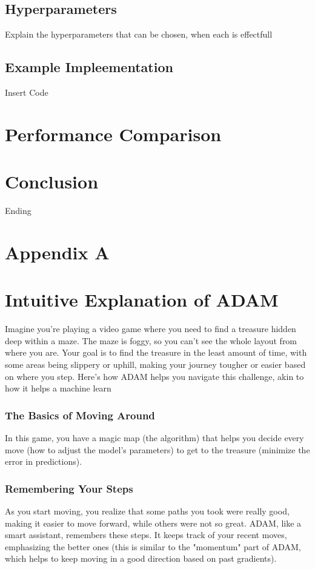 \documentclass[journal]{IEEEtran}
\begin{document}
\subsection{Hyperparameters}
Explain the hyperparameters that can be chosen, when each is effectfull
\subsection{Example Impleementation}
Insert Code

\section{Performance Comparison}

 
\section{Conclusion}
Ending




\onecolumn
\newpage
\pagestyle{fancy}

\section{Appendix A}
\section*{Intuitive Explanation of ADAM}
Imagine you're playing a video game where you need to find a treasure hidden deep within a maze. The maze is foggy, so you can't see the whole layout from where you are. Your goal is to find the treasure in the least amount of time, with some areas being slippery or uphill, making your journey tougher or easier based on where you step. Here's how ADAM helps you navigate this challenge, akin to how it helps a machine learn

\subsubsection*{The Basics of Moving Around}
In this game, you have a magic map (the algorithm) that helps you decide every move (how to adjust the model's parameters) to get to the treasure (minimize the error in predictions).

\subsubsection*{Remembering Your Steps}
As you start moving, you realize that some paths you took were really good, making it easier to move forward, while others were not so great. ADAM, like a smart assistant, remembers these steps. It keeps track of your recent moves, emphasizing the better ones (this is similar to the "momentum" part of ADAM, which helps to keep moving in a good direction based on past gradients).
\end{document}
